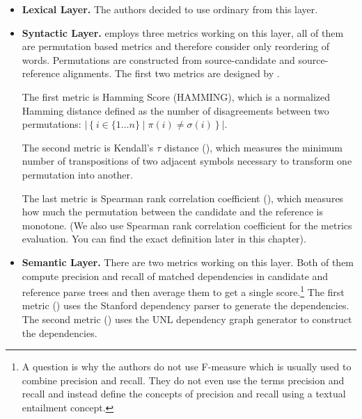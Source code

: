 \begin{itemize}

    \item \textbf{Lexical Layer.} The authors decided to use ordinary
         from this layer.

    \item \textbf{Syntactic Layer.}  employs three metrics
        working on this layer, 
        all of them are permutation based
        metrics and therefore consider only reordering of words. Permutations
        are constructed from source-candidate and source-reference alignments.
        The first two metrics are designed by .

        The first metric is Hamming Score (HAMMING), which is a normalized
        Hamming distance defined as the number of disagreements between two
        permutations: $\left| \left\{ i \in \{1 \ldots n\} \mid \pi(i) \ne
        \sigma(i) \right\} \right|$. 

        The second metric is Kendall's $\tau$ distance (), which
        measures the minimum number of transpositions of two adjacent symbols
        necessary to transform one permutation into another.
        
        The last metric
        is Spearman rank correlation coefficient (), which
        measures how much the permutation between the candidate and the
        reference is monotone. (We also use Spearman rank correlation coefficient
        for the metrics evaluation. You can find the exact definition later in
        this chapter).

    \item \textbf{Semantic Layer.} There are two metrics working on this layer.
        Both of them compute precision and recall of matched dependencies in
        candidate and reference parse trees and then average them to get a
        single score.\footnote{A question is why the authors do not use
            F-measure which is usually used to combine precision and recall.
        They do not even use the terms precision and recall and instead
    define the concepts of precision and recall using a textual entailment
concept.}  The first metric () uses the Stanford dependency
parser  to generate the dependencies. The
second metric () uses the UNL dependency graph generator to
construct the dependencies.

\end{itemize}

